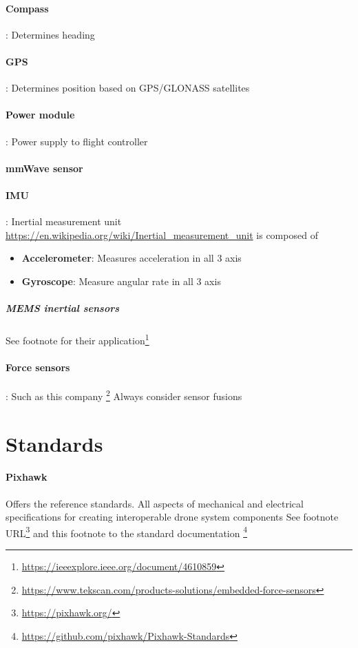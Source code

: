 \documentclass{article}
\begin{document}
			\paragraph{Compass}: Determines heading
			\paragraph{GPS}: Determines position based on GPS/GLONASS satellites
			\paragraph{Power module}: Power supply to flight controller
			\paragraph{mmWave sensor}
			\paragraph{IMU}: Inertial measurement unit \url{https://en.wikipedia.org/wiki/Inertial_measurement_unit}
				is composed of 
				\begin{itemize}
					\item \textbf{Accelerometer}: Measures acceleration in all 3 axis
					\item \textbf{Gyroscope}: Measure angular rate in all 3 axis
				\end{itemize}
				\subparagraph{MEMS inertial sensors}
				See footnote for their application\footnote{\url{https://ieeexplore.ieee.org/document/4610859}}
			\paragraph{Force sensors}: Such as this company \footnote{\url{https://www.tekscan.com/products-solutions/embedded-force-sensors}}
		Always consider sensor fusions
		
		
	\section{Standards}
		\paragraph{Pixhawk}
			Offers the reference standards. All aspects of mechanical and electrical specifications for creating interoperable drone system components
			See footnote URL\footnote{\url{https://pixhawk.org/}} and this footnote to the standard documentation \footnote{\url{https://github.com/pixhawk/Pixhawk-Standards}}
\end{document}
